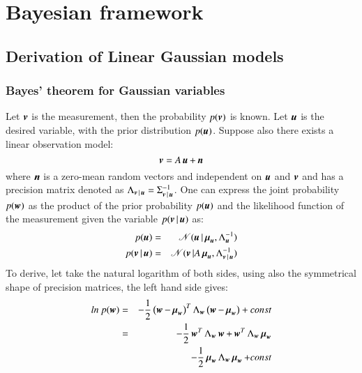 \chapter{Bayesian framework}
\label{apx_BayesGausvars}

\section{Derivation of Linear Gaussian models}
\label{apx_BayesGausvars_1}
\subsection{Bayes' theorem for Gaussian variables}
Let $ \operatorname{\boldsymbol{v}} $ is the measurement, then the probability $ p(\operatorname{\boldsymbol{v}}) $ is known. Let $ \operatorname{\boldsymbol{u}} $ is the desired variable, with the prior distribution $ p(\operatorname{\boldsymbol{u}}) $. Suppose also there exists a linear observation model:
\begin{equation}
	\mybold{v}=A\mybold{u}+\mybold{n}
\label{eq:LG5}
\end{equation}
where $ \operatorname{\boldsymbol{n}} $ is a zero-mean random vectors and independent on $ \operatorname{\boldsymbol{u}} $ and $ \operatorname{\boldsymbol{v}} $ and has a precision matrix denoted as $ \Lambda_{\operatorname{\boldsymbol{v}}|\operatorname{\boldsymbol{u}}}= \Sigma_{\operatorname{\boldsymbol{v}}|\operatorname{\boldsymbol{u}}}^{-1}$. One can express the joint probability $ p(\operatorname{\boldsymbol{w}})$ as the product of the prior probability $ p(\operatorname{\boldsymbol{u}}) $ and the likelihood function of the measurement given the variable $ p(\operatorname{\boldsymbol{v}}|\operatorname{\boldsymbol{u}})$ as:
\begin{eqnarray}
	p(\mybold{u})=&&\distr(\mybold{u}|\mybold{\mu}_{\mybold{u}},\Lambda^{-1}_{\mybold{u}}) \\
	p(\mybold{v}|\mybold{u})=&&\distr(\mybold{v}|A\mybold{\mu}_{\mybold{u}},\Lambda_{\mybold{v}|\mybold{u}}^{-1})
\label{eq:LG6}
\end{eqnarray}
To derive, let take the natural logarithm of both sides, using also the symmetrical shape of precision matrices,  the left hand side gives:
\begin{eqnarray}
	ln \: p(\mybold{w}) =&& -\frac{1}{2} \left(\mybold{w}-\mybold{\mu}_{\mybold{w}} \right)^T \Lambda_{\mybold{w}} \left(\mybold{w}-\mybold{\mu}_{\mybold{w}} \right) + const \nonumber\\
	=&& -\frac{1}{2} \mybold{w}^T \Lambda_{\mybold{w}} \mybold{w} +\mybold{w}^T \Lambda_{\mybold{w}} \mybold{\mu}_{\mybold{w}} \nonumber\\
	&& - \frac{1}{2} \mybold{\mu}_{\mybold{w}} \Lambda_{\mybold{w}} \mybold{\mu}_{\mybold{w}} + const
	\label{eq:LG7}
\end{eqnarray}
